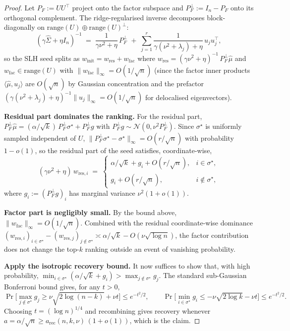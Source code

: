 \begin{proof}
Let $P_F := UU^\top$ project onto the factor subspace and $P_F^\perp := I_n - P_F$ onto its
orthogonal complement. The ridge-regularised inverse decomposes block-diagonally on
$\mathrm{range}(U)\oplus\mathrm{range}(U)^\perp$:
\begin{equation}\label{eq:ridge-decomp}
  (\gamma\hat\Sigma+\eta I_n)^{-1}
  \;=\; \frac{1}{\gamma\nu^2+\eta}\,P_F^\perp
        \;+\; \sum_{j=1}^{r}\frac{1}{\gamma(\nu^2+\lambda_j)+\eta}\, u_j u_j^\top,
\end{equation}
so the SLH seed splits as $w_{\mathrm{init}} = w_{\mathrm{res}} + w_{\mathrm{fac}}$ where
\(
  w_{\mathrm{res}} = (\gamma\nu^2+\eta)^{-1}\,P_F^\perp\hat\mu
\)
and $w_{\mathrm{fac}}\in\mathrm{range}(U)$ with $\|w_{\mathrm{fac}}\|_\infty = O(1/\sqrt n)$
(since the factor inner products $\langle\hat\mu, u_j\rangle$ are $O(\sqrt n)$ by Gaussian
concentration and the prefactor $(\gamma(\nu^2+\lambda_j)+\eta)^{-1}\|u_j\|_\infty = O(1/\sqrt n)$
for delocalised eigenvectors).

\textbf{Residual part dominates the ranking.} For the residual part,
$P_F^\perp\hat\mu = (\alpha/\sqrt k)\,P_F^\perp\sigma^\star + P_F^\perp g$
with $P_F^\perp g \sim \mathcal N(0,\nu^2 P_F^\perp)$. Since $\sigma^\star$ is uniformly
sampled independent of $U$, $\|P_F^\perp\sigma^\star - \sigma^\star\|_\infty = O(r/\sqrt n)$
with probability $1-o(1)$, so the residual part of the seed satisfies, coordinate-wise,
\[
  (\gamma\nu^2+\eta)\,w_{\mathrm{res},i}
  \;=\;
  \begin{cases}
    \alpha/\sqrt k + g_i + O(r/\sqrt n), & i\in\sigma^\star,\\
    g_i + O(r/\sqrt n), & i\notin\sigma^\star,
  \end{cases}
\]
where $g_i := (P_F^\perp g)_i$ has marginal variance $\nu^2(1+o(1))$.

\textbf{Factor part is negligibly small.} By the bound above, $\|w_{\mathrm{fac}}\|_\infty
= O(1/\sqrt n)$. Combined with the residual coordinate-wise dominance
$(w_{\mathrm{res},i})_{i\in\sigma^\star} - (w_{\mathrm{res},j})_{j\notin\sigma^\star} \asymp
\alpha/\sqrt k - O(\nu\sqrt{\log n})$, the factor contribution does not change the top-$k$
ranking outside an event of vanishing probability.

\textbf{Apply the isotropic recovery bound.} It now suffices to show that, with high
probability, $\min_{i\in\sigma^\star}(\alpha/\sqrt k + g_i) >
\max_{j\notin\sigma^\star} g_j$. The standard sub-Gaussian Bonferroni bound gives, for any $t>0$,
\[
\Pr\bigl[\max_{j\notin\sigma^\star} g_j \ge \nu\sqrt{2\log(n-k)} + \nu t\bigr] \le e^{-t^2/2},
\qquad
\Pr\bigl[\min_{i\in\sigma^\star} g_i \le -\nu\sqrt{2\log k} - \nu t\bigr] \le e^{-t^2/2}.
\]
Choosing $t = (\log n)^{1/4}$ and recombining gives recovery whenever
$a = \alpha/\sqrt n \ge a_{\mathrm{rec}}(n,k,\nu)\,(1+o(1))$, which is the claim.


\end{proof}

